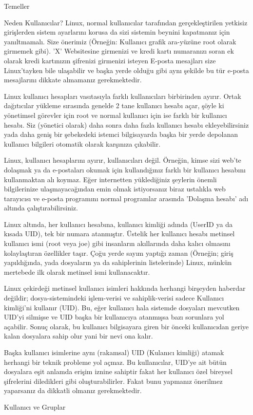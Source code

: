 \begin{section}{Temeller}
\begin{subsection}{Neden Kullanıcılar?}
Linux, normal kullanıcılar tarafından gerçekleştirilen yetkisiz girişlerden sistem ayarlarını korusa da sizi sistemin beynini kapatmanız için yanıltmamalı. Size önerimiz (Örneğin: Kullanıcı grafik ara-yüzüne root olarak girmemek gibi). ’X’ Websitesine girmenizi ve kredi kartı numaranızı soran ek olarak kredi kartınızın şifrenizi girmenizi isteyen E-posta mesajları size Linux'tayken bile ulaşabilir ve başka yerde olduğu gibi aynı şekilde bu tür e-posta mesajlarını dikkate almamanız gerekmektedir.

Linux kullanıcı hesapları vasıtasıyla farklı kullanıcıları birbirinden ayırır. Ortak dağıtıcılar yükleme sırasında genelde 2 tane kullanıcı hesabı açar, şöyle ki yönetimsel görevler için root ve normal kullanıcı için ise farklı bir kullanıcı hesabı. Siz (yönetici olarak) daha sonra daha fazla kullanıcı hesabı ekleyebilirsiniz yada daha geniş bir şebekedeki istemci bilgisayarda başka bir yerde depolanan kullanıcı bilgileri otomatik olarak karşınıza çıkabilir.

Linux, kullanıcı hesaplarını ayırır, kullanıcıları değil. Örneğin, kimse sizi web'te dolaşmak ya da e-postaları okumak için kullandığınız farklı bir kullanıcı hesabını kullanmaktan alı koymaz. Eğer internetten yüklediğiniz şeylerin önemli bilgilerinize ulaşmayacağından emin olmak istiyorsanız biraz ustalıkla web tarayıcısı ve e-posta programını normal programlar arasında 'Dolaşma hesabı' adı altında çalıştırabilirsiniz.

Linux altında, her kullanıcı hesabına, kullanıcı kimliği adında (UserID ya da kısada UID), tek  bir numara atanmıştır. Üstelik her kullanıcı hesabı metinsel kullanıcı ismi (root veya joe) gibi insanların akıllarında daha kalıcı olmasını kolaylaştıran özellikler taşır. Çoğu yerde sayım yaptığı zaman (Örneğin; giriş yapıldığında, yada dosyaların ya da sahiplerinin listelerinde) Linux, münkün mertebede ilk olarak metinsel ismi kullanacaktır.

Linux çekirdeği metinsel kullanıcı isimleri hakkında herhangi birşeyden haberdar değildir; dosya-sistemindeki işlem-verisi ve sahiplik-verisi sadece Kullanıcı kimliği'ni kullanır (UID). Bu, eğer kullanıcı hala sistemde dosyaları mevcutken UID’yi silmişse ve UID başka bir kullanıcıya atanmışsa bazı sorunlara yol açabilir. Sonuç olarak, bu kullanıcı bilgisayara giren bir önceki kullanıcıdan geriye kalan dosyalara sahip olur yani bir nevi ona kalır.

Başka kullanıcı isimlerine aynı (rakamsal) UID (Kulanıcı kimliği) atamak herhangi bir teknik probleme yol açmaz. Bu kullanıcılar, UID'ye ait bütün dosyalara eşit anlamda erişim iznine sahiptir fakat her kullanıcı özel bireysel şifrelerini diledikleri gibi oluşturabilirler. Fakat bunu yapmanız önerilmez yaparsanız da dikkatli olmanız gerekmektedir.
\end{subsection}
\begin{subsection}{Kullanıcı ve Gruplar}


\end{subsection}
\end{section}
